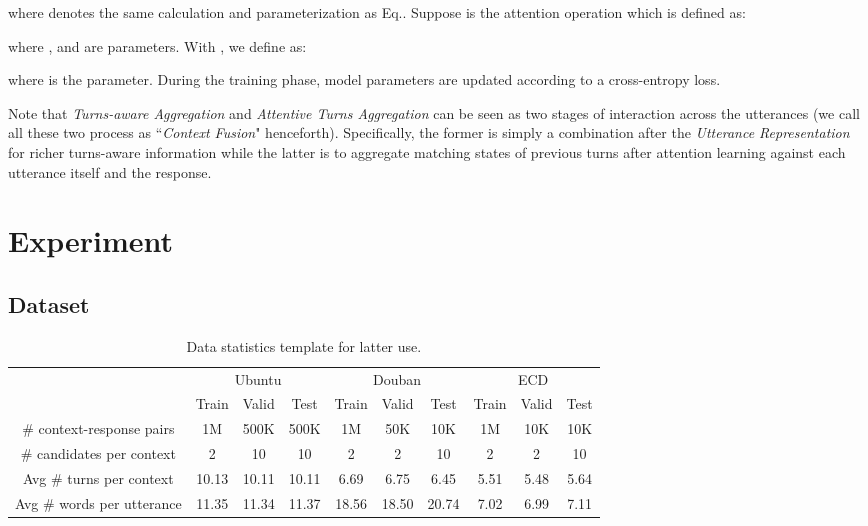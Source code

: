 \documentclass[11pt]{article}
\begin{document}
 
where  denotes the same calculation and parameterization as Eq.. Suppose  is the attention operation which is defined as:

where ,  and   are parameters. With , we define  as:

where  is the parameter. During the training phase, model parameters are updated according to a cross-entropy loss.

Note that \emph{Turns-aware Aggregation} and \emph{Attentive Turns Aggregation} can be seen as two stages of interaction across the utterances (we call all these two process as ``\emph{Context Fusion}" henceforth). Specifically, the former is simply a combination after the \emph{Utterance Representation} for richer turns-aware information while the latter is to  aggregate matching states of previous turns after attention learning against each utterance itself and the response.

\section{Experiment}

\subsection{Dataset}

\begin{table*}
	\centering
	{
		\begin{tabular}{cccccccccc}
			\hline
			
			\hline
			& \multicolumn{3}{c}{Ubuntu} & \multicolumn{3}{c}{Douban}  & \multicolumn{3}{c}{ECD}  \\
			&Train & Valid & Test & Train & Valid & Test & Train & Valid & Test  \\
			\hline
			\# context-response pairs & 1M & 500K & 500K &1M & 50K & 10K  &1M & 10K & 10K\\
			\# candidates per context  & 2 & 10  & 10 & 2 & 2 & 10& 2 & 2 & 10\\
			Avg \#  turns per context & 10.13 & 10.11 & 10.11 & 6.69 & 6.75 & 6.45 & 5.51 & 5.48 & 5.64\\
			Avg \# words per utterance & 11.35 & 11.34 & 11.37 & 18.56 & 18.50 & 20.74 & 7.02 & 6.99 & 7.11\\
			\hline
			
			\hline
		\end{tabular}
	}
	\caption{\label{tab:dataset}  Data statistics template for latter use.}
\end{table*}
\end{document}
